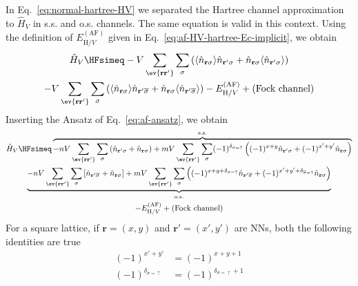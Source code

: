 \begin{tabproof}
	
	In Eq.~\eqref{eq:normal-hartree-HV} we separated the Hartree channel approximation to $\hat H_V$ in s.s. and o.s. channels. The same equation is valid in this context. Using the definition of $E_{\mathrm{H}/V}^{(\mathrm{AF})}$ given in Eq.~\eqref{eq:af-HV-hartree-Ec-implicit}, we obtain
	\begin{multline}
		\hat H_V \HFsimeq
		-V \sum_{\ev{\mathbf{r}\mathbf{r}'}} \sum_\sigma \left(
			\langle
			\hat n_{\mathbf{r}\sigma}
			\rangle \hat n_{\mathbf{r}'\sigma} + \hat n_{\mathbf{r}\sigma} \langle
			\hat n_{\mathbf{r}'\sigma}
			\rangle
		\right) \\
		-V \sum_{\ev{\mathbf{r}\mathbf{r}'}} \sum_\sigma \left(
			\langle
			\hat n_{\mathbf{r}\sigma}
			\rangle \hat  n_{\mathbf{r}'\overline{\sigma}} + \hat n_{\mathbf{r}\sigma} \langle
			\hat n_{\mathbf{r}'\overline{\sigma}}
			\rangle
		\right)
		- E_{\mathrm{H}/V}^{(\mathrm{AF})} \label{eq:af-V-wick-decomposition-operatorial} + (\text{Fock channel})
	\end{multline}
	Inserting the Ansatz of Eq.~\eqref{eq:af-ansatz}, we obtain
	\begin{multline*}
		\hat H_V \HFsimeq
		\overbrace{
			-nV \sum_{\ev{\mathbf{r}\mathbf{r}'}} \sum_\sigma \left(
				\hat n_{\mathbf{r}'\sigma} + \hat n_{\mathbf{r}\sigma}
			\right) 
			+ mV \sum_{\ev{\mathbf{r}\mathbf{r}'}} \sum_\sigma (-1)^{\delta_{\sigma=\uparrow}} \left(
				(-1)^{x+y} \hat n_{\mathbf{r}'\sigma} + (-1)^{x'+y'} \hat n_{\mathbf{r}\sigma}
			\right)
		}^{\mathrm{s.s.}} \\
		\underbrace{
			-nV \sum_{\ev{\mathbf{r}\mathbf{r}'}} \sum_\sigma \left[
			\hat n_{\mathbf{r}'\overline{\sigma}} + \hat n_{\mathbf{r}\sigma}
			\right] + mV \sum_{\ev{\mathbf{r}\mathbf{r}'}} \sum_\sigma \left(
			(-1)^{x+y+\delta_{\sigma=\uparrow}} \hat n_{\mathbf{r}'\overline{\sigma}} + (-1)^{x'+y'+\delta_{\overline{\sigma}=\uparrow}} \hat n_{\mathbf{r}\sigma}
			\right)
		}_{\mathrm{o.s.}} \\
		- E_{\mathrm{H}/V}^{(\mathrm{AF})} + (\text{Fock channel})
	\end{multline*}
	For a square lattice, if $\mathbf{r} = (x,y)$ and $\mathbf{r}' = (x',y')$ are NNs, both the following identities are true
	\[
	\begin{aligned}
		(-1)^{x'+y'} &= (-1)^{x+y+1} \\
		(-1)^{\delta_{\overline{\sigma}=\uparrow}} &= (-1)^{\delta_{\sigma=\uparrow}+1}

\end{aligned}\]
\end{tabproof}
